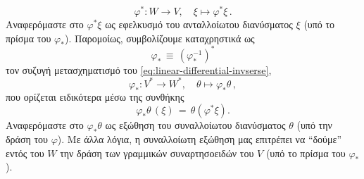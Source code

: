 \documentclass[11pt,a4paper,twoside,openright]{book}
\begin{document}
\begin{equation}\label{eq:linear-differential-invserse}
\varphi^*: W \to V,\quad \xi \mapsto \varphi^* \xi\,.
\end{equation}
Αναφερόμαστε στο $\varphi^* \xi$ ως εφελκυσμό του ανταλλοίωτου διανύσματος $\xi$ (υπό το πρίσμα του $\varphi_*$).
Παρομοίως, συμβολίζουμε καταχρηστικά ως
\begin{equation}\label{eq:linear-differential-inverse}
\varphi_* \,\equiv\, (\varphi_*^{-1})^*
\end{equation}
τον συζυγή μετασχηματισμό του \eqref{eq:linear-differential-invserse},
\begin{equation}\label{eq:linear-differential-adjoint-inverse}
\varphi_*: V^* \to W^*,\quad \theta \mapsto \varphi_* \theta\,,
\end{equation}
που ορίζεται ειδικότερα μέσω της συνθήκης
\begin{equation}\label{eq:linear-differential-adjoint-inverse-eval}
\varphi_*\theta \,(\xi) \,=\, \theta \left(\varphi^* \xi \right).
\end{equation}
Aναφερόμαστε στο $\varphi_* \theta$ ως εξώθηση του συναλλοίωτου διανύσματος $\theta$ (υπό την δράση του $\varphi$).
Με άλλα λόγια,
η συναλλοίωτη εξώθηση μας επιτρέπει να ``δούμε''
εντός του $W$ την δράση των γραμμικών συναρτησοειδών του $V$
(υπό το πρίσμα του $\varphi_*$).
\end{document}
